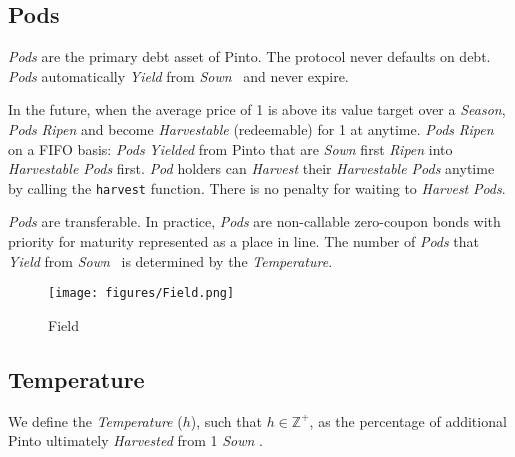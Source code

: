 \documentclass[tikz]{article}
\newcommand{\code}[1]{\texttt{#1}}
\newcommand{\term}[1]{\textsl{#1}}
\newcommand{\Pinto}{} %
\begin{document}

\vspace{-0.35cm}
\subsection{Pods}
\vspace{-0.35cm}

\term{Pods} are the primary debt asset of Pinto. The protocol never defaults on debt. \term{Pods} automatically \term{Yield} from \term{Sown} \Pinto\ and never expire.

\vspace{-0.2cm}

In the future, when the average price of \Pinto1 is above its value target over a \term{Season}, \term{Pods} \term{Ripen} and become \term{Harvestable} (redeemable) for \Pinto1 at anytime. \term{Pods} \term{Ripen} on a FIFO basis: \term{Pods} \term{Yielded} from Pinto that are \term{Sown} first \term{Ripen} into \term{Harvestable Pods} first. \term{Pod} holders can \term{Harvest} their \term{Harvestable Pods} anytime by calling the \code{harvest} function. There is no penalty for waiting to \term{Harvest} \term{Pods}.

\vspace{-0.2cm}

\term{Pods} are transferable. In practice, \term{Pods} are non-callable zero-coupon bonds with priority for maturity represented as a place in line. The number of \term{Pods} that \term{Yield} from \term{Sown} \Pinto\ is determined by the \term{Temperature}.

\vspace{-0.35cm}


\begin{figure}[h!]
    \centering
    \texttt{[image: figures/Field.png]}
    \vspace*{-5mm}
    \caption{Field}
    \label{Field}
\end{figure}


\subsection{Temperature}
\vspace*{-1mm}

We define the \term{Temperature} ($h$), such that $h \in \mathbb{Z}^{+}$, as the percentage of additional Pinto ultimately \term{Harvested} from 1 \term{Sown} \Pinto.
\end{document}
